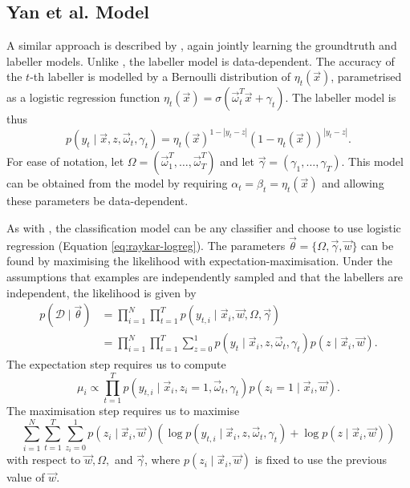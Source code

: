     \subsection{Yan et al. Model}
    \label{sec:yan}

        A similar approach is described by \citet{yan10}, again jointly learning
        the groundtruth and labeller models. Unlike \citeauthor{raykar10}, the
        \citeauthor{yan10} labeller model is data-dependent. The accuracy of the
        $t$-th labeller is modelled by a Bernoulli distribution of $\eta_t(\vec
        x)$, parametrised as a logistic regression function $\eta_t(\vec x) =
        \sigma(\vec \omega_t^T \vec x + \gamma_t)$. The labeller model is thus
        \begin{equation*}
            p(y_t \mid \vec x, z, \vec \omega_t, \gamma_t) =
                \eta_t(\vec x)^{1 - |y_t - z|} (1 - \eta_t(\vec x))^{|y_t - z|}.
        \end{equation*}
        For ease of notation, let $\Omega = (\vec \omega_1^T, \dots,
        \vec \omega_T^T)$ and let $\vec \gamma = (\gamma_1, \dots, \gamma_T)$.
        This model can be obtained from the \citeauthor{raykar10} model by
        requiring $\alpha_t = \beta_t = \eta_t(\vec x)$ and allowing these
        parameters be data-dependent.

        As with \citeauthor{raykar10}, the classification model can be any
        classifier and \citeauthor{yan10} choose to use logistic regression
        (Equation \ref{eq:raykar-logreg}). The parameters $\vec \theta =
        \{\Omega, \vec \gamma, \vec w\}$ can be found by maximising the
        likelihood with expectation-maximisation. Under the assumptions that
        examples are independently sampled and that the labellers are
        independent, the likelihood is given by
        \begin{align*}
            p(\mathcal D \mid \vec \theta)
                &= \prod_{i = 1}^N \prod_{t = 1}^T
                    p(y_{t, i} \mid \vec x_i, \vec w, \Omega, \vec \gamma)\\
                &= \prod_{i = 1}^N \prod_{t = 1}^T \sum_{z = 0}^1
                    p(y_t \mid \vec x_i, z, \vec \omega_t, \gamma_t)
                    p(z \mid \vec x_i, \vec w).
        \end{align*}
        The expectation step requires us to compute
        \[
            \mu_i \propto \prod_{t = 1}^{T}
                p(y_{t, i} \mid \vec x_i, z_i = 1, \vec \omega_t, \gamma_t)
                p(z_i = 1 \mid \vec x_i, \vec w).
        \]
        The maximisation step requires us to maximise
        \begin{equation*}
            \sum_{i = 1}^N \sum_{t = 1}^T \sum_{z_i = 0}^1
                p(z_i \mid \vec x_i, \vec w) (
                    \log p(y_{t, i} \mid \vec x_i, z, \vec \omega_t, \gamma_t) +
                    \log p(z \mid \vec x_i, \vec w))
        \end{equation*}
        with respect to $\vec w, \Omega,$ and $\vec \gamma$, where $p(z_i \mid
        \vec x_i, \vec w)$ is fixed to use the previous value of $\vec w$.


